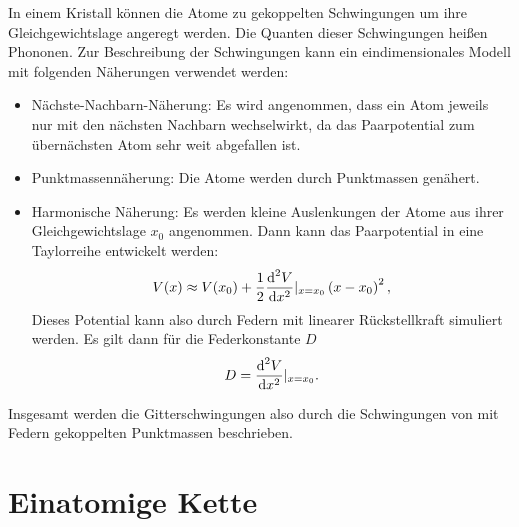 In einem Kristall können die Atome zu gekoppelten Schwingungen um ihre Gleichgewichtslage angeregt werden. Die Quanten dieser Schwingungen heißen Phononen. Zur Beschreibung der Schwingungen kann ein eindimensionales Modell mit folgenden Näherungen verwendet werden:
\begin{itemize}
  \item Nächste-Nachbarn-Näherung: Es wird angenommen, dass ein Atom jeweils nur mit den nächsten Nachbarn wechselwirkt, da das Paarpotential zum übernächsten Atom sehr weit abgefallen ist.
  \item Punktmassennäherung: Die Atome werden durch Punktmassen genähert.
  \item Harmonische Näherung: Es werden kleine Auslenkungen der Atome aus ihrer Gleichgewichtslage $x_{0}$ angenommen. Dann kann das Paarpotential in eine Taylorreihe entwickelt werden:
      \begin{equation}
       V(x) \approx V(x_{0}) +\frac{1}{2} \frac{\text{d}^{2}V}{\text{d} x^{2}}\rvert_{x=x_{0}} \left(x-x_{0}\right)^{2}, 
      \end{equation}
      Dieses Potential kann also durch Federn mit linearer Rückstellkraft simuliert werden. Es gilt dann für die Federkonstante $D$
      \begin{equation}
       D = \frac{\text{d}^{2}V}{\text{d} x^{2}}|_{x=x_{0}}.
      \end{equation}
\end{itemize}
Insgesamt werden die Gitterschwingungen also durch die Schwingungen von mit Federn gekoppelten Punktmassen beschrieben.

\section{Einatomige Kette}

